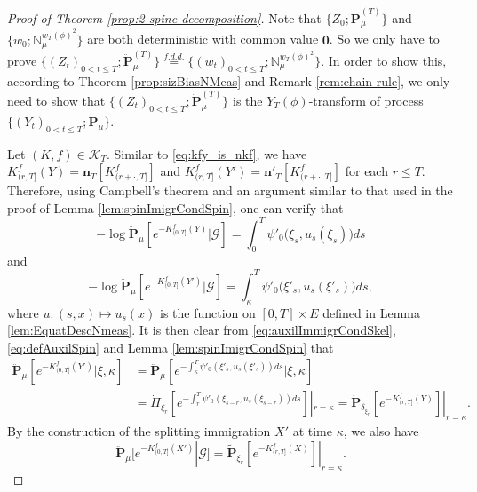 \documentclass[UTF8]{pkuthss}
\theoremstyle{plain}
\theoremstyle{definition}
\numberwithin{equation}{section}
\begin{document}
\begin{proof}[Proof of Theorem \ref{prop:2-spine-decomposition}]
 Note that $\{Z_0;\ddot{\mathbf P}^{(T)}_\mu\}$ and $\{w_0;\mathbb N^{w_T(\phi)^2}_\mu\}$ are both deterministic with common value $\mathbf 0$.
	So we only have to prove
$
	\{(Z_t)_{0< t\leq T};\ddot{\mathbf P}^{(T)}_\mu\} \overset{f.d.d.}{=} \{(w_t)_{0<t\leq T};\mathbb N^{w_T(\phi)^2}_\mu\}.	
$
	In order to show this, according to Theorem \ref{prop:sizBiasNMeas} and Remark \ref{rem:chain-rule}, we only need to show that
$\{(Z_t)_{0< t\leq T};\ddot{\mathbf P}^{(T)}_\mu\}$ is the $Y_T(\phi)$-transform of process $\{(Y_t)_{0< t\leq T}; \dot {\mathbf P}_\mu\}$.
\par
 Let $(K,f)\in \mathcal K_T$. 
 Similar to \eqref{eq:kfy_is_nkf}, 
 we have $K_{(r, T]}^f(Y) = \mathbf n_T[K^f_{(r+\cdot, T]}]$ and $K_{(r, T]}^f(Y') = \mathbf n'_T[K^f_{(r+\cdot, T]}]$ for each $r\leq T$.
	Therefore, 
using Campbell's theorem and an argument similar to that used in the proof of Lemma \ref{lem:spinImigrCondSpin}, 
	one can verify that
\begin{equation}\label{eq:mainImmigrCondSkel}
	- \log\ddot {\mathbf P}_\mu [e^{-K^f_{(0, T]}(Y)}|\mathscr G]
	=
	 \int_0^T\psi'_0\big(\xi_s,u_s(\xi_s)\big)ds
\end{equation}
	and
\begin{equation}\label{eq:auxilImmigrCondSkel}
	- \log\ddot {\mathbf P}_\mu [e^{-K^f_{(0, T]}(Y')}|\mathscr G]
	=
 \int_\kappa^T \psi'_0\big(\xi'_s,u_s(\xi'_s)\big)ds,
\end{equation}
	where $u:(s,x)\mapsto u_s(x)$ is the function on $[0,T]\times E$ defined in Lemma \ref{lem:EquatDescNmeas}.
	It is then clear from \eqref{eq:auxilImmigrCondSkel}, \eqref{eq:defAuxilSpin} and Lemma \ref{lem:spinImigrCondSpin} that
\begin{align}
\label{eq:auxilImmigrCondMainSpin}
    \ddot{\mathbf P}_\mu[e^{-K^f_{(0, T]}(Y')}|\xi,\kappa]
	&= \ddot{\mathbf P}_\mu[e^{-\int_\kappa^T\psi'_0(\xi'_s,u_s(\xi'_s))ds}|\xi,\kappa]\\
	&= \dot{\Pi}_{\xi_r}[e^{-\int_r^T\psi'_0(\xi_{s-r},u_s(\xi_{s-r}))ds}]|_{r=\kappa}
	= \dot{\mathbf P}_{\delta_{\xi_r}} [e^{-K^f_{(r, T]}(Y)}]|_{r=\kappa}.
\end{align}
	By the construction of the splitting immigration $X'$ at time $\kappa$, we also have
\begin{equation}\label{eq:oneTimImmigrCondSkel}
    \ddot {\mathbf P}_\mu[e^{-K^f_{(0, T]}(X')}|\mathscr G ]
	= \widetilde{\mathbf P}_{\xi_r}[e^{-K^f_{(r, T]}(X)}]|_{r=\kappa}.

\end{equation}
\end{proof}
\end{document}

